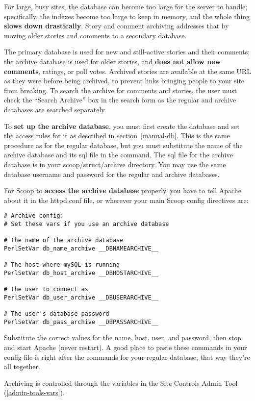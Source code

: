 For large, busy sites, the database can become too large for the server to handle; specifically, the indexes become too large to keep in memory, and the whole thing {\bf slows down drastically}.  Story and comment archiving addresses that by moving older stories and comments to a secondary database.

The primary database is used for new and still-active stories and their comments; the archive database is used for older stories, and {\bf does not allow new comments}, ratings, or poll votes.  Archived stories are available at the same URL as they were before being archived, to prevent links bringing people to your site from breaking.  To search the archive for comments and stories, the user must check the ``Search Archive'' box in the search form as the regular and archive databases are searched separately.

To {\bf set up the archive database}, you must first create the database and set the access rules for it as described in section~\ref{manual-db}.  This is the same procedure as for the regular database, but you must substitute the name of the archive database and its sql file in the command.  The sql file for the archive database is in your scoop/struct/archive directory.  You may use the same database username and password for the regular and archive databases.

For Scoop to {\bf access the archive database} properly, you have to tell Apache about it in the httpd.conf file, or wherever your main Scoop config directives are:

\begin{verbatim}
# Archive config:
# Set these vars if you use an archive database

# The name of the archive database
PerlSetVar db_name_archive __DBNAMEARCHIVE__

# The host where mySQL is running
PerlSetVar db_host_archive __DBHOSTARCHIVE__

# The user to connect as
PerlSetVar db_user_archive __DBUSERARCHIVE__

# The user's database password
PerlSetVar db_pass_archive __DBPASSARCHIVE__
\end{verbatim}

Substitute the correct values for the name, host, user, and password, then stop and start Apache (never restart).  A good place to paste these commands in your config file is right after the commands for your regular database; that way they're all together.

Archiving is controlled through the variables in the Site Controls Admin Tool (\ref{admin-tools-vars}).


